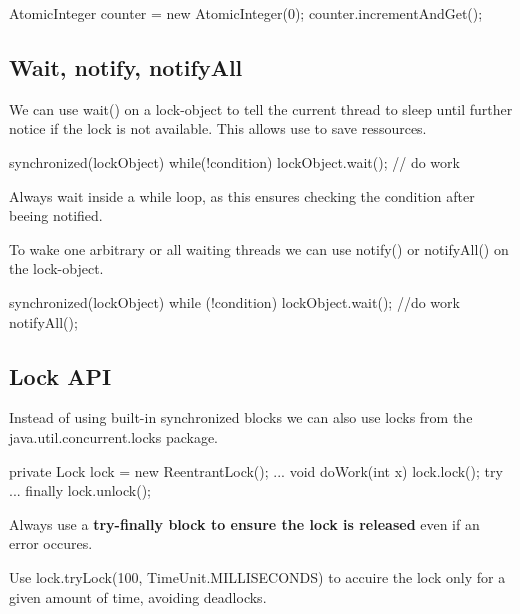 \begin{codeexample}
AtomicInteger counter = new AtomicInteger(0);
counter.incrementAndGet();
\end{codeexample}

\subsection{Wait, notify, notifyAll}

We can use wait() on a lock-object to tell the current thread to sleep until further notice if the lock is
not available. This allows use to save ressources.

\begin{codeexample}
synchronized(lockObject) {
    while(!condition) {
        lockObject.wait();
    }
    // do work
} 
\end{codeexample}

\begin{important}
Always wait inside a while loop, as this ensures checking the condition after beeing notified.
\end{important}

To wake one arbitrary or all waiting threads we can use notify() or notifyAll() on the lock-object.

\begin{codeexample}
synchronized(lockObject) {
    while (!condition) {
        lockObject.wait();
    }
    //do work
    notifyAll();
}
\end{codeexample}

\subsection{Lock API}

Instead of using built-in synchronized blocks we can also use locks from the java.util.concurrent.locks
package.

\begin{codeexample}
private Lock lock = new ReentrantLock();
...
void doWork(int x) {
    lock.lock();
    try {
        ...
    } finally {
        lock.unlock();
    }
}
\end{codeexample}

\begin{important}
Always use a \textbf{try-finally block to ensure the lock is released} even if an error occures.            
\end{important}

\begin{remark}
Use lock.tryLock(100, TimeUnit.MILLISECONDS) to accuire the lock only for
a given amount of time, avoiding deadlocks.
\end{remark}

